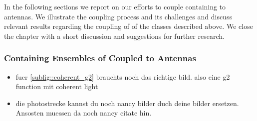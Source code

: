 		In the following sections we report on our efforts to couple \nds containing \sivs to antennas. We illustrate the coupling process and its challenges and discuss relevant results regarding the coupling of \nds of the classes described above. We close the chapter with a short discussion and suggestions for further research.



		\subsubsection{\Nds Containing Ensembles of \sivs Coupled to Antennas}\label{subsubsection::antenna_multiple_sivs}

			\begin{remark}
				\begin{itemize}
						\item fuer \autoref{subfig::coherent_g2} brauchts noch das richtige bild. also eine g2 function mit coherent light
						\item die photostrecke \pp kannst du noch nancy bilder duch deine bilder ersetzen. Ansosten muessen da noch nancy citate hin.
			\end{itemize}
			\end{remark}

